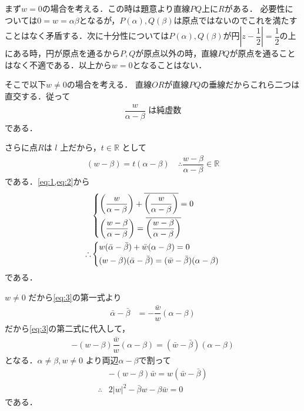 \documentclass[../../main.tex]{subfiles}
\begin{document}
まず$w=0$の場合を考える．この時は題意より直線$PQ$上に$R$がある．
必要性については$0=w=\alpha\beta$となるが，$P(\alpha), Q(\beta)$は原点ではないのでこれを満たすことはなく矛盾する．次に十分性については$P(\alpha), Q(\beta)$が円$\left|z-\dfrac{1}{2}\right|=\dfrac{1}{2}$の上にある時，円が原点を通るから$P,Q$が原点以外の時，直線$PQ$が原点を通ることはなく不適である．以上から$w=0$となることはない．

そこで以下$w \neq 0$の場合を考える．
直線$OR$が直線$PQ$の垂線だからこれら二つは直交する．従って
\begin{align}
  \dfrac{w}{\alpha - \beta} \text{ は純虚数} \label{eq:1}
\end{align}
である．

さらに点$R$は $l$ 上だから，$t \in \mathbb{R}$ として
\begin{align}
  (w - \beta) = t(\alpha - \beta)
  \quad\therefore
  \dfrac{w-\beta}{\alpha-\beta} \in \mathbb{R} \label{eq:2}
\end{align}
である．\cref{eq:1,eq:2}から
\begin{align}
  &
  \begin{dcases}
    \left( \dfrac{w}{\alpha-\beta} \right) + \overline{\left( \dfrac{w}{\alpha-\beta} \right)} = 0 \\
    \left( \dfrac{w-\beta}{\alpha-\beta} \right) = \overline{\left( \dfrac{w-\beta}{\alpha-\beta} \right)}
  \end{dcases} \\
  \therefore
  &
  \begin{dcases}
    w(\bar{\alpha}-\bar{\beta}) + \bar{w}(\alpha-\beta) = 0  \\
    (w-\beta)(\bar{\alpha}-\bar{\beta}) = (\bar{w}-\bar{\beta})(\alpha-\beta)
  \end{dcases} \label{eq:3}
\end{align}
である．

$w \neq 0$ だから\cref{eq:3}の第一式より
\begin{align}
  \bar{\alpha}-\bar{\beta} &= -\dfrac{\bar{w}}{w}(\alpha-\beta)
\end{align}
だから\cref{eq:3}の第二式に代入して，
\begin{align}
  -(w-\beta)\dfrac{\bar{w}}{w}(\alpha-\beta) = (\bar{w}-\bar{\beta})(\alpha-\beta)
\end{align}
となる．$\alpha \neq \beta, w \neq 0$ より両辺$\alpha-\beta$で割って
\begin{align}
  & -(w-\beta)\bar{w} = w(\bar{w}-\bar{\beta}) \\
  \therefore
  & 2|w|^2 - \bar{\beta}w - \beta\bar{w} = 0  \label{eq:4}
\end{align}
である．
\end{document}
